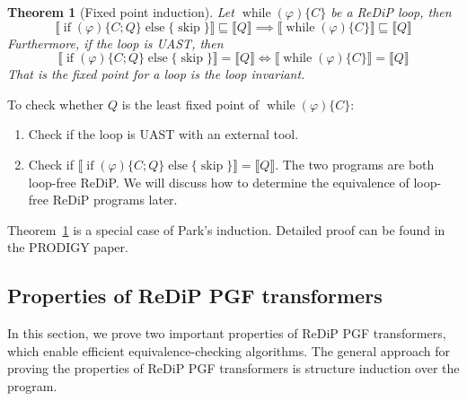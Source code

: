\documentclass[a4paper]{article}
\renewcommand{\S}[1]{ \llbracket #1 \rrbracket }
\newtheorem{theorem}{Theorem}[section]
\begin{document}
\begin{theorem}[Fixed point induction]\label{thm:lfp-ind}
	Let \(\operatorname{while}(\varphi)\{C\}\) be a ReDiP loop, then
	\[
		\S{\operatorname{if}(\varphi)\{C;Q\}\operatorname{else}\{\operatorname{skip}\}} \sqsubseteq \S{Q}
		\implies
		\S{\operatorname{while}(\varphi)\{C\}} \sqsubseteq \S{Q}
	\]
	Furthermore, if the loop is UAST, then
	\[
		\S{\operatorname{if}(\varphi)\{C;Q\}\operatorname{else}\{\operatorname{skip}\}} = \S{Q}
		\iff
		\S{\operatorname{while}(\varphi)\{C\}} = \S{Q}
	\]
	That is the fixed point for a loop is the loop invariant.
\end{theorem}
To check whether \(Q\) is the least fixed point of \(\operatorname{while}(\varphi)\{C\}\):
\begin{enumerate}
	\item Check if the loop is UAST with an external tool.
	\item Check if \(\S{\operatorname{if}(\varphi)\{C;Q\}\operatorname{else}\{\operatorname{skip}\}} = \S{Q}\).
	      The two programs are both loop-free ReDiP.
	      We will discuss how to determine the equivalence of loop-free ReDiP programs later.
\end{enumerate}
Theorem~\ref{thm:lfp-ind} is a special case of Park's induction. Detailed proof can be found in the PRODIGY paper\cite{cav-extended}.

\subsection{Properties of ReDiP PGF transformers}

In this section, we prove two important properties of ReDiP PGF transformers, which enable efficient equivalence-checking algorithms.
The general approach for proving the properties of ReDiP PGF transformers is structure induction over the program.
\end{document}
